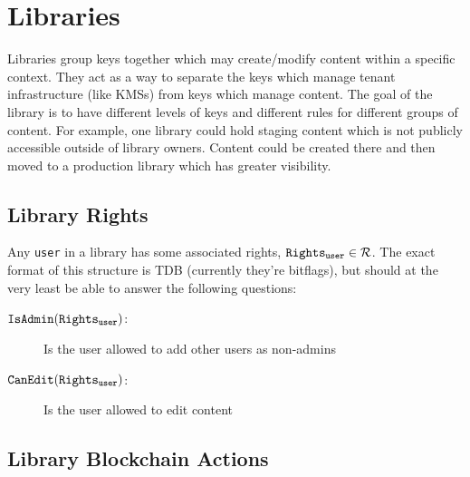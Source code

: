 \section{Libraries}
Libraries group keys together which may create/modify content within a specific context. 
They act as a way to separate the keys which manage tenant infrastructure (like KMSs) from keys which manage content.
The goal of the library is to have different levels of keys and different rules for different groups of content.
For example, one library could hold staging content which is not publicly accessible outside of library owners.
Content could be created there and then moved to a production library which has greater visibility.

\subsection{Library Rights}
Any \texttt{user} in a library has some associated rights, $\mathtt{Rights_{user}} \in \mathcal{R}$. 
The exact format of this structure is TDB (currently they're bitflags), but should at the very least be able to answer the following questions:

\begin{description}
  \item[$\mathtt{IsAdmin}(\mathtt{Rights_{user}})$:] Is the user allowed to add other users as non-admins
  \item[$\mathtt{CanEdit}(\mathtt{Rights_{user}})$:]  Is the user allowed to edit content
\end{description}

\subsection{Library Blockchain Actions}

